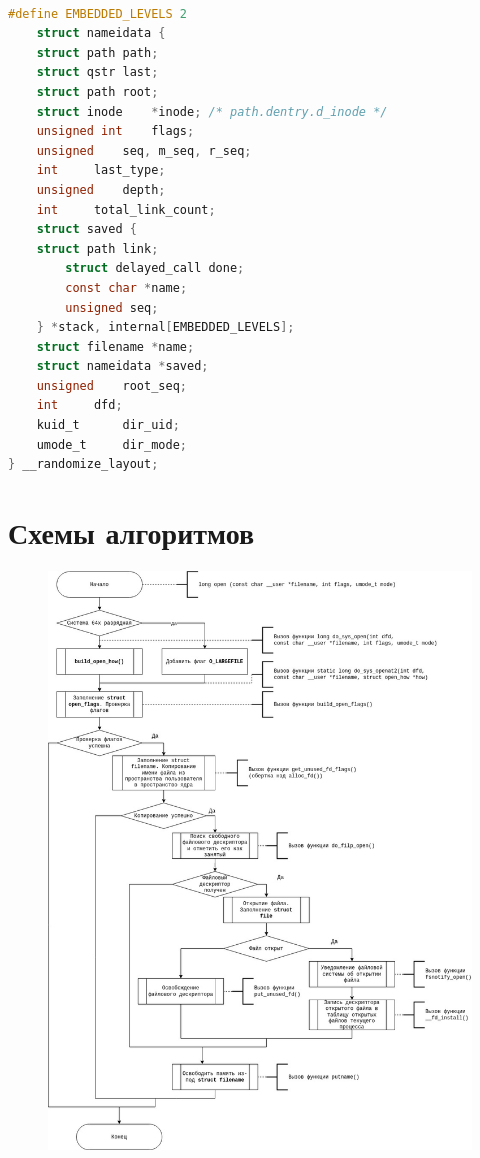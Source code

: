\documentclass[12pt]{report}
\begin{document}
\begin{lstlisting}[language=c, label=lst:nameidata, caption=Листинг структуры nameidata]

#define EMBEDDED_LEVELS 2
	struct nameidata {
	struct path	path;
	struct qstr	last;
	struct path	root;
	struct inode	*inode; /* path.dentry.d_inode */
	unsigned int	flags;
	unsigned	seq, m_seq, r_seq;
	int		last_type;
	unsigned	depth;
	int		total_link_count;
	struct saved {
	struct path link;
		struct delayed_call done;
		const char *name;
		unsigned seq;
	} *stack, internal[EMBEDDED_LEVELS];
	struct filename	*name;
	struct nameidata *saved;
	unsigned	root_seq;
	int		dfd;
	kuid_t		dir_uid;
	umode_t		dir_mode;
} __randomize_layout;
\end{lstlisting}

\chapter{Схемы алгоритмов}

\begin{figure}[H]
	\centering
	\includegraphics[scale=0.38]{img/open.jpg}
	\label{fig:open}
\end{figure}
\end{document}
